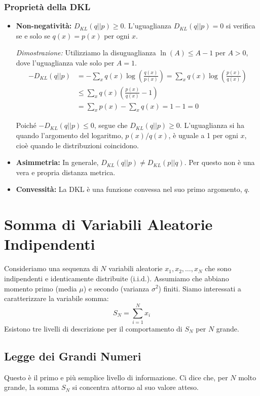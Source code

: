 \subsubsection{Proprietà della DKL}
\begin{itemize}
 \item \textbf{Non-negatività:} $D_{KL}(q || p) \ge 0$. L'uguaglianza $D_{KL}(q || p) = 0$ si verifica se e solo se $q(x) = p(x)$ per ogni $x$.

    \textit{Dimostrazione:}
    Utilizziamo la disuguaglianza $\ln(A) \le A - 1$ per $A > 0$, dove l'uguaglianza vale solo per $A=1$.
    \begin{align*}
    -D_{KL}(q || p) &= -\sum_x q(x) \log\left(\frac{q(x)}{p(x)}\right) = \sum_x q(x) \log\left(\frac{p(x)}{q(x)}\right) \\
     &\le \sum_x q(x) \left(\frac{p(x)}{q(x)} - 1\right) \\
    &= \sum_x p(x) - \sum_x q(x) = 1 - 1 = 0
    \end{align*}
    
    Poiché $-D_{KL}(q || p) \le 0$, segue che $D_{KL}(q || p) \ge 0$. L'uguaglianza si ha quando l'argomento del logaritmo, $p(x)/q(x)$, è uguale a 1 per ogni $x$, cioè quando le distribuzioni coincidono.
 
 \item \textbf{Asimmetria:} In generale, $D_{KL}(q || p) \neq D_{KL}(p || q)$. Per questo non è una vera e propria distanza metrica.
 \item \textbf{Convessità:} La DKL è una funzione convessa nel suo primo argomento, $q$.
\end{itemize}


\newpage
\section{Somma di Variabili Aleatorie Indipendenti}

Consideriamo una sequenza di $N$ variabili aleatorie $x_1, x_2, \dots, x_N$ che sono indipendenti e identicamente distribuite (i.i.d.). Assumiamo che abbiano momento primo (media $\mu$) e secondo (varianza $\sigma^2$) finiti. Siamo interessati a caratterizzare la variabile somma:
\begin{equation}
 S_N = \sum_{i=1}^N x_i
\end{equation}
Esistono tre livelli di descrizione per il comportamento di $S_N$ per $N$ grande.

\subsection{Legge dei Grandi Numeri}
Questo è il primo e più semplice livello di informazione. Ci dice che, per $N$ molto grande, la somma $S_N$ si concentra attorno al suo valore atteso.

